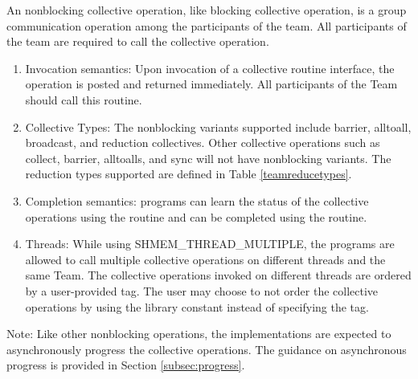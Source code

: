 An \openshmem nonblocking collective operation, like blocking collective
operation, is a group communication operation among the
participants of the team. All participants of the team are required to call the
collective operation.

\begin{enumerate}

\item Invocation semantics: Upon invocation of a collective routine interface,
the operation is posted and returned immediately. All participants of the Team
should call this routine.

\item Collective Types: The nonblocking variants supported include barrier, alltoall,
broadcast, and reduction collectives. Other collective operations such as
collect, barrier, alltoalls, and sync will not have nonblocking variants. The
reduction types supported are defined in Table \ref{teamreducetypes}.

\item Completion semantics:  \openshmem programs can learn the status of the collective operations
using the  routine and can be completed using
the  routine.

\item Threads: While using SHMEM\_THREAD\_MULTIPLE, the \openshmem
programs are allowed to call multiple collective operations on different threads
and the same Team. The collective operations invoked on different threads
are ordered by a user-provided tag. The user may choose to not order the
collective operations by using the library constant
 instead of specifying the tag.

\end{enumerate}

Note: Like other nonblocking \openshmem operations, the implementations are
expected to asynchronously progress the collective operations. The guidance on
asynchronous progress is provided in Section \ref{subsec:progress}.



